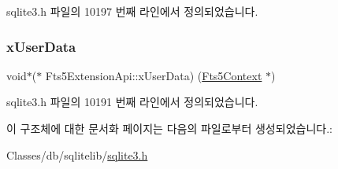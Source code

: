sqlite3.\+h 파일의 10197 번째 라인에서 정의되었습니다.

\mbox{\label{struct_fts5_extension_api_a8e651288d8e0cf25f20f2b838f47ac34}} 
\subsubsection{\texorpdfstring{x\+User\+Data}{xUserData}}
{\footnotesize\ttfamily void$\ast$($\ast$ Fts5\+Extension\+Api\+::x\+User\+Data) (\hyperlink{sqlite3_8h_a97821b95ebebd43db901977ffd5b26bc}{Fts5\+Context} $\ast$)}



sqlite3.\+h 파일의 10191 번째 라인에서 정의되었습니다.



이 구조체에 대한 문서화 페이지는 다음의 파일로부터 생성되었습니다.\+:\begin{DoxyCompactItemize}
\item 
Classes/db/sqlitelib/\hyperlink{sqlite3_8h}{sqlite3.\+h}\end{DoxyCompactItemize}
